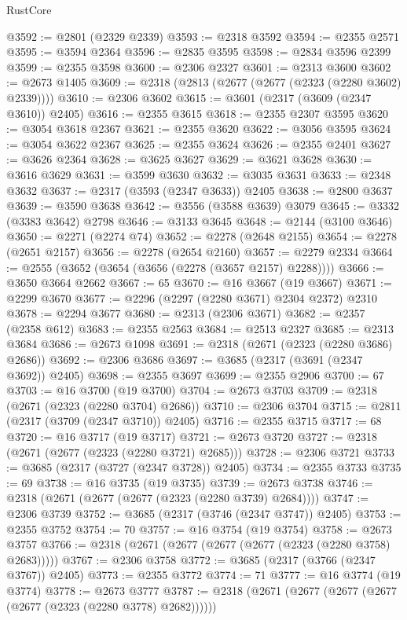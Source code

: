 \begin{lexlean}{RustCore}
\begin{coremodule}
@3592 := @2801 (@2329 @2339)
@3593 := @2318 @3592
@3594 := @2355 @2571
@3595 := @3594 @2364
@3596 := @2835 @3595
@3598 := @2834 @3596 @2399
@3599 := @2355 @3598
@3600 := @2306 @2327
@3601 := @2313 @3600
@3602 := @2673 @1405
@3609 := @2318 (@2813 (@2677 (@2677 (@2323 (@2280 @3602) @2339))))
@3610 := @2306 @3602
@3615 := @3601 (@2317 (@3609 (@2347 @3610)) @2405)
@3616 := @2355 @3615
@3618 := @2355 @2307 @3595
@3620 := @3054 @3618 @2367
@3621 := @2355 @3620
@3622 := @3056 @3595
@3624 := @3054 @3622 @2367
@3625 := @2355 @3624
@3626 := @2355 @2401
@3627 := @3626 @2364
@3628 := @3625 @3627
@3629 := @3621 @3628
@3630 := @3616 @3629
@3631 := @3599 @3630
@3632 := @3035 @3631
@3633 := @2348 @3632
@3637 := @2317 (@3593 (@2347 @3633)) @2405
@3638 := @2800 @3637
@3639 := @3590 @3638
@3642 := @3556 (@3588 @3639) @3079
@3645 := @3332 (@3383 @3642) @2798
@3646 := @3133 @3645
@3648 := @2144 (@3100 @3646)
@3650 := @2271 (@2274 @74)
@3652 := @2278 (@2648 @2155)
@3654 := @2278 (@2651 @2157)
@3656 := @2278 (@2654 @2160)
@3657 := @2279 @2334
@3664 := @2555 (@3652 (@3654 (@3656 (@2278 (@3657 @2157) @2288))))
@3666 := @3650 @3664 @2662
@3667 := 65
@3670 := @16 @3667 (@19 @3667)
@3671 := @2299 @3670
@3677 := @2296 (@2297 (@2280 @3671) @2304 @2372) @2310
@3678 := @2294 @3677
@3680 := @2313 (@2306 @3671)
@3682 := @2357 (@2358 @612)
@3683 := @2355 @2563
@3684 := @2513 @2327
@3685 := @2313 @3684
@3686 := @2673 @1098
@3691 := @2318 (@2671 (@2323 (@2280 @3686) @2686))
@3692 := @2306 @3686
@3697 := @3685 (@2317 (@3691 (@2347 @3692)) @2405)
@3698 := @2355 @3697
@3699 := @2355 @2906
@3700 := 67
@3703 := @16 @3700 (@19 @3700)
@3704 := @2673 @3703
@3709 := @2318 (@2671 (@2323 (@2280 @3704) @2686))
@3710 := @2306 @3704
@3715 := @2811 (@2317 (@3709 (@2347 @3710)) @2405)
@3716 := @2355 @3715
@3717 := 68
@3720 := @16 @3717 (@19 @3717)
@3721 := @2673 @3720
@3727 := @2318 (@2671 (@2677 (@2323 (@2280 @3721) @2685)))
@3728 := @2306 @3721
@3733 := @3685 (@2317 (@3727 (@2347 @3728)) @2405)
@3734 := @2355 @3733
@3735 := 69
@3738 := @16 @3735 (@19 @3735)
@3739 := @2673 @3738
@3746 := @2318 (@2671 (@2677 (@2677 (@2323 (@2280 @3739) @2684))))
@3747 := @2306 @3739
@3752 := @3685 (@2317 (@3746 (@2347 @3747)) @2405)
@3753 := @2355 @3752
@3754 := 70
@3757 := @16 @3754 (@19 @3754)
@3758 := @2673 @3757
@3766 := @2318 (@2671 (@2677 (@2677 (@2677 (@2323 (@2280 @3758) @2683)))))
@3767 := @2306 @3758
@3772 := @3685 (@2317 (@3766 (@2347 @3767)) @2405)
@3773 := @2355 @3772
@3774 := 71
@3777 := @16 @3774 (@19 @3774)
@3778 := @2673 @3777
@3787 := @2318 (@2671 (@2677 (@2677 (@2677 (@2677 (@2323 (@2280 @3778) @2682))))))

\end{coremodule}
\end{lexlean}
